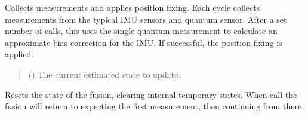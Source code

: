 \documentclass[letterpaper,10pt,english]{sphinxmanual}
\begin{document}
\begin{fulllineitems}
\begin{fulllineitems}
\label{\detokenize{modules/quantum/base:qnav.quantum.base.ConceptQuantumFusion.perform_fusion}}
\pysigstartsignatures
{}
\pysigstopsignatures
\sphinxAtStartPar
Collects measurements and applies position fixing.
Each cycle collects measurements from the typical IMU sensors and
quantum sensor. After a set number of calls, this uses the single
quantum measurement to calculate an approximate bias correction for
the IMU. If successful, the position fixing is applied.
\begin{quote}\begin{description}
\sphinxAtStartPar
{} ({\hyperref[\detokenize{modules/estimation/state:qnav.estimation.state.EstimatedState}]{}}) \textendash{} The current estimated state to update.

\end{description}\end{quote}

\end{fulllineitems}


\begin{fulllineitems}
\label{\detokenize{modules/quantum/base:qnav.quantum.base.ConceptQuantumFusion.reset}}
\pysigstartsignatures
{}
\pysigstopsignatures
\sphinxAtStartPar
Resets the state of the fusion, clearing internal temporary states.
When call the fusion will return to expecting the first measurement,
then continuing from there.

\end{fulllineitems}



\end{fulllineitems}
\end{document}
